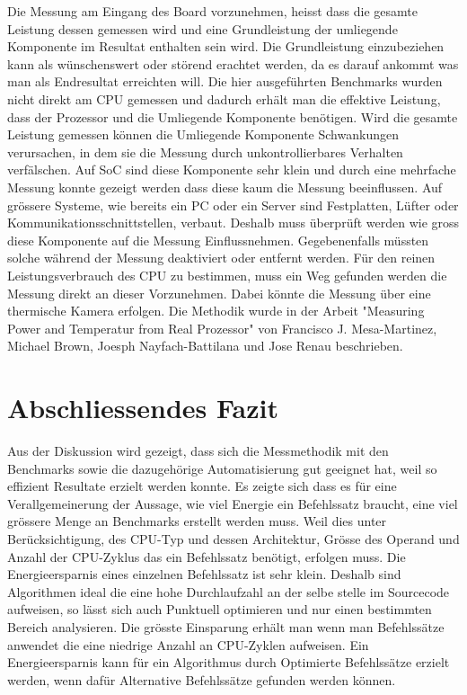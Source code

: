 Die Messung am Eingang des Board vorzunehmen, heisst dass die gesamte Leistung dessen gemessen wird und eine Grundleistung der umliegende Komponente im Resultat enthalten sein wird. Die Grundleistung einzubeziehen kann als wünschenswert oder störend erachtet werden, da es darauf ankommt was man als Endresultat erreichten will. Die hier ausgeführten Benchmarks wurden nicht direkt am CPU gemessen und dadurch erhält man die effektive Leistung, dass der Prozessor und die Umliegende Komponente benötigen. Wird die gesamte Leistung gemessen können die Umliegende Komponente Schwankungen verursachen, in dem sie die Messung durch unkontrollierbares Verhalten verfälschen. Auf SoC sind diese Komponente sehr klein und durch eine mehrfache Messung konnte gezeigt werden dass diese kaum die Messung beeinflussen. Auf grössere Systeme, wie bereits ein PC oder ein Server sind Festplatten, Lüfter oder Kommunikationsschnittstellen, verbaut. Deshalb muss überprüft werden wie gross diese Komponente auf die Messung Einflussnehmen. Gegebenenfalls müssten solche während der Messung deaktiviert oder entfernt werden. Für den reinen Leistungsverbrauch des CPU zu bestimmen, muss ein Weg gefunden werden die Messung direkt an dieser Vorzunehmen. Dabei könnte die Messung über eine thermische Kamera erfolgen. Die Methodik wurde in der Arbeit "Measuring Power and Temperatur from Real Prozessor"\cite{measuring_power_temperature,} von Francisco J. Mesa-Martinez,  Michael Brown, Joesph  Nayfach-Battilana und Jose Renau beschrieben.


\section{Abschliessendes Fazit}
Aus der Diskussion wird gezeigt, dass sich die Messmethodik mit den Benchmarks sowie die dazugehörige Automatisierung gut geeignet hat, weil so effizient Resultate erzielt werden konnte. Es zeigte sich dass es für eine Verallgemeinerung der Aussage, wie viel Energie ein Befehlssatz braucht, eine viel grössere Menge an Benchmarks erstellt werden muss. Weil dies unter Berücksichtigung, des CPU-Typ und dessen Architektur, Grösse des Operand und Anzahl der CPU-Zyklus das ein Befehlssatz benötigt, erfolgen muss. Die Energieersparnis eines einzelnen Befehlssatz ist sehr klein. Deshalb sind Algorithmen ideal die eine hohe Durchlaufzahl an der selbe stelle im Sourcecode aufweisen, so lässt sich auch Punktuell optimieren und nur einen bestimmten Bereich analysieren. Die grösste Einsparung erhält man wenn man Befehlssätze anwendet die eine niedrige Anzahl an CPU-Zyklen aufweisen. Ein Energieersparnis kann für ein Algorithmus durch Optimierte Befehlssätze erzielt werden, wenn dafür Alternative Befehlssätze gefunden werden können.
